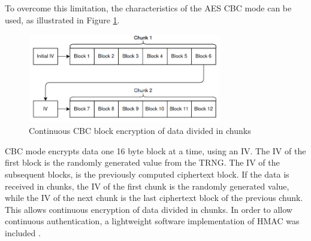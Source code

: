To overcome this limitation, the characteristics of the AES CBC mode can be used, as illustrated in Figure \ref{fig:protocol:cbc-chunks}. 
\begin{figure}[h!]
	\centering
	\includegraphics[width=0.75\textwidth]{./Images/cbc-chunks.png}
	\caption{Continuous CBC block encryption of data divided in chunks}
	\label{fig:protocol:cbc-chunks}
\end{figure}
CBC mode encrypts data one 16 byte block at a time, using an IV. The IV of the first block is the randomly generated value from the TRNG. The IV of the subsequent blocks, is the previously computed ciphertext block.
If the data is received in chunks, the IV of the first chunk is the randomly generated value, while the IV of the next chunk is the last ciphertext block of the previous chunk.
This allows continuous encryption of data divided in chunks.
In order to allow continuous authentication, a lightweight software implementation of HMAC was included \cite{ogayHMAC}.

